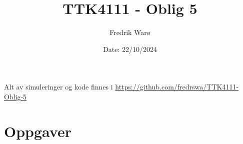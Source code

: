 \documentclass[11pt, a4paper, norsk]{rapport1} %
\begin{document}
\nocite{*}

\title{TTK4111 - Oblig 5}
\author{Fredrik Warø}
\date{Date: 22/10/2024}
\begin{titlepage}
    \maketitle
    \begin{figure}
    \centering
    \end{figure}
    \thispagestyle{empty}
\end{titlepage}
    Alt av simuleringer og kode finnes i \url{https://github.com/fredrswa/TTK4111-Oblig-5}






\setcounter{page}{1} %

\section{Oppgaver}
\end{document}
